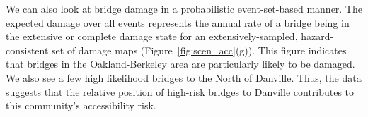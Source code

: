 We can also look at bridge damage in a probabilistic event-set-based manner. The expected damage over all events represents the annual rate of a bridge being in the extensive or complete damage state for an extensively-sampled, hazard-consistent set of damage maps (Figure~\ref{fig:scen_acc}{(g)}). This figure indicates that bridges in the Oakland-Berkeley area are particularly likely to be damaged. We also see a few high likelihood bridges to the North of Danville. Thus, the data suggests that the relative position of high-risk bridges to Danville contributes to this community's accessibility risk.



